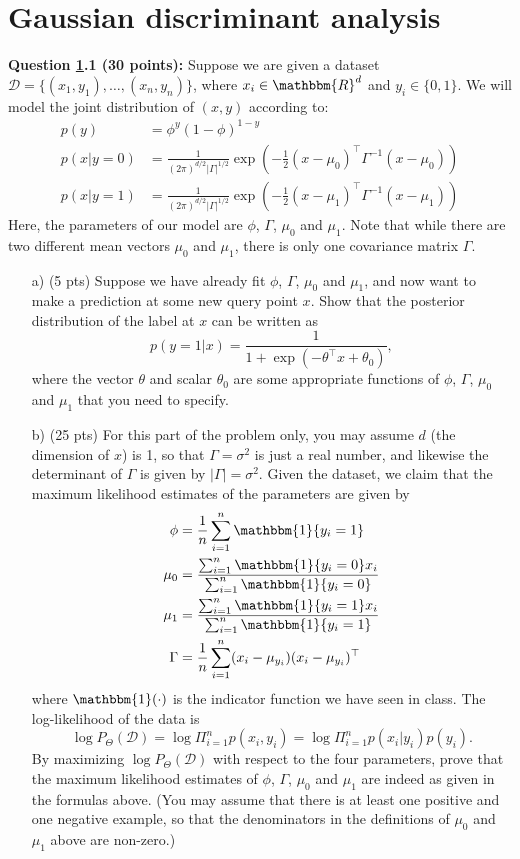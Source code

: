\documentclass[12pt]{article}
\begin{document}
\section{Gaussian discriminant analysis}
\label{sec:gda}

\textbf{Question \ref{sec:gda}.1 (30 points):} Suppose we are given a dataset $\mathcal{D}=\{(x_1,y_1),\ldots,(x_n,y_n)\}$, where $x_i\in\mathbbm{R}^d$ and $y_i\in\{0,1\}$. We will model the joint distribution of $(x,y)$ according to:
\begin{align*}
    p(y)&=\phi^y(1-\phi)^{1-y}\\
    p(x|y=0)&=\frac{1}{(2\pi)^{d/2}|\Gamma|^{1/2}}\exp\left(-\frac{1}{2}(x-\mu_0)^\top\Gamma^{-1}(x-\mu_0)\right)\\
    p(x|y=1)&=\frac{1}{(2\pi)^{d/2}|\Gamma|^{1/2}}\exp\left(-\frac{1}{2}(x-\mu_1)^\top\Gamma^{-1}(x-\mu_1)\right)
\end{align*}
Here, the parameters of our model are $\phi$, $\Gamma$, $\mu_0$ and $\mu_1$. Note that while there are two different mean vectors $\mu_0$ and $\mu_1$, there is only one covariance matrix $\Gamma$.
\begin{enumerate}
    \item[a)] (5 pts) Suppose we have already fit $\phi$, $\Gamma$, $\mu_0$ and $\mu_1$, and now want to make a prediction at some new query point $x$. Show that the posterior distribution of the label at $x$ can be written as $$p(y = 1|x)=\frac{1}{1 + \exp(-\theta^\top x+\theta_0)},$$
    where the vector $\theta$ and scalar $\theta_0$ are some appropriate functions of $\phi$, $\Gamma$, $\mu_0$ and $\mu_1$ that you need to specify.
    \item[b)] (25 pts) For this part of the problem only, you may assume $d$ (the dimension of $x$)
    is 1, so that $\Gamma=\sigma^2$ is just a real number, and likewise the determinant of $\Gamma$ is given by $|\Gamma|=\sigma^2$. Given the dataset, we claim that the maximum likelihood estimates of the parameters are given by
    \begin{align*}
        \phi&=\frac{1}{n}\sum_{i=1}^n\mathbbm{1}\{y_i=1\}\\
        \mu_0&=\frac{\sum_{i=1}^n\mathbbm{1}\{y_i=0\}x_i}{\sum_{i=1}^n\mathbbm{1}\{y_i=0\}}\\
        \mu_1&=\frac{\sum_{i=1}^n\mathbbm{1}\{y_i=1\}x_i}{\sum_{i=1}^n\mathbbm{1}\{y_i=1\}}\\
        \Gamma &= \frac{1}{n}\sum_{i=1}^n(x_i-\mu_{y_i})(x_i-\mu_{y_i})^\top
    \end{align*}
    where $\mathbbm{1}(\cdot)$ is the indicator function we have seen in class. The log-likelihood of the data is $$\log P_\Theta(\mathcal{D})=\log\Pi_{i=1}^n p(x_i,y_i)=\log\Pi_{i=1}^n p(x_i|y_i)p(y_i).$$
    By maximizing $\log P_\Theta(\mathcal{D})$ with respect to the four parameters, prove that the maximum likelihood estimates of $\phi$, $\Gamma$, $\mu_0$ and $\mu_1$ are indeed as given in the formulas above. (You may assume that there is at least one positive and one negative example, so that the denominators in the definitions of $\mu_0$ and $\mu_1$ above are non-zero.)
\end{enumerate} 
\end{document}
